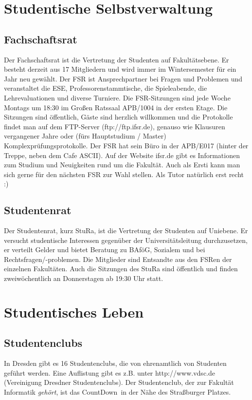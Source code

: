 \documentclass[a4paper,12pt]{report}
\begin{document}
\section{Studentische Selbstverwaltung}
\subsection{Fachschaftsrat}
Der Fachschaftsrat ist die Vertretung der Studenten auf Fakultätsebene.
Er besteht derzeit aus 17 Mitgliedern und wird immer im Wintersemester für ein Jahr neu gewählt.
Der FSR ist Ansprechpartner bei Fragen und Problemen und veranstaltet die ESE, Professorenstammtische, die Spieleabende, die Lehrevaluationen und diverse Turniere.
Die FSR-Sitzungen sind jede Woche Montags um 18:30 im Großen Ratssaal APB/1004 in der ersten Etage.
Die Sitzungen sind öffentlich, Gäste sind herzlich willkommen und die Protokolle findet man auf dem FTP-Server (ftp://ftp.ifsr.de), genauso wie Klausuren vergangener Jahre oder (fürs Hauptstudium / Master) Komplexprüfungsprotokolle.
Der FSR hat sein Büro in der APB/E017 (hinter der Treppe, neben dem Cafe ASCII).
Auf der Website ifsr.de gibt es Informationen zum Studium und Neuigkeiten rund um die Fakultät.
Auch als Ersti kann man sich gerne für den nächsten FSR zur Wahl stellen. Als Tutor natürlich erst recht :)

\subsection{Studentenrat}
Der Studentenrat, kurz StuRa, ist die Vertretung der Studenten auf Uniebene.
Er versucht studentische Interessen gegenüber der Universitätsleitung durchzusetzen, er verteilt Gelder und bietet Beratung zu BAföG, Sozialem und bei Rechtsfragen/-problemen.
Die Mitglieder sind Entsandte aus den FSRen der einzelnen Fakultäten.
Auch die Sitzungen des StuRa sind öffentlich und finden zweiwöchentlich an Donnerstagen ab 19:30 Uhr statt.

\section{Studentisches Leben}
\subsection{Studentenclubs}
In Dresden gibt es 16 Studentenclubs, die von ehrenamtlich von Studenten geführt werden.
Eine Auflistung gibt es z.B. unter http://www.vdsc.de (Vereinigung Dresdner Studentenclubs).
Der Studentenclub, der zur Fakultät Informatik \textit{gehört}, ist das \glqq CountDown\grqq\ in der Nähe des Straßburger Platzes.
\end{document}
